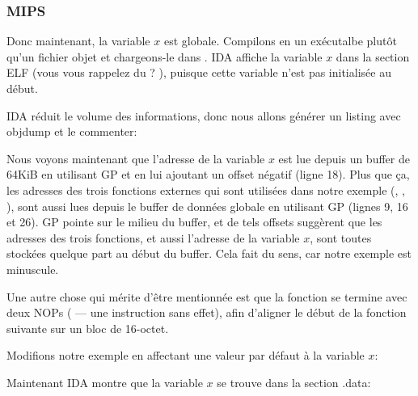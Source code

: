 \subsubsection{MIPS}


Donc maintenant, la variable $x$ est globale.
Compilons en un exécutalbe plutôt qu'un fichier objet et chargeons-le dans \IDA.
IDA affiche la variable $x$ dans la section ELF  (vous vous rappelez du
? ),
puisque cette variable n'est pas initialisée au début.



IDA réduit le volume des informations, donc nous allons générer un listing avec
objdump et le commenter:



Nous voyons maintenant que l'adresse de la variable $x$ est lue depuis un buffer
de 64KiB en utilisant GP et en lui ajoutant un offset négatif (ligne 18).
Plus que ça, les adresses des trois fonctions externes qui sont utilisées dans
notre exemple (\puts, \scanf, \printf), sont aussi lues depuis le buffer de données
globale en utilisant GP (lignes 9, 16 et 26).
GP pointe sur le milieu du buffer, et de tels offsets suggèrent que les adresses
des trois fonctions, et aussi l'adresse de la variable $x$, sont toutes stockées
quelque part au début du buffer.
Cela fait du sens, car notre exemple est minuscule.


Une autre chose qui mérite d'être mentionnée est que la fonction se termine avec
deux \ac{NOP}s ( --- une instruction sans effet), afin d'aligner
le début de la fonction suivante sur un bloc de 16-octet.


Modifions notre exemple en affectant une valeur par défaut à la variable $x$:



Maintenant IDA montre que la variable $x$ se trouve dans la section .data:

